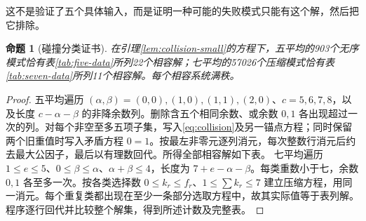 \documentclass[11pt,a4paper,oneside,openany]{book}
\newtheorem{proposition}[theorem]{命题}
\theoremstyle{definition}
\numberwithin{equation}{chapter}
\begin{document}
这不是验证了五个具体输入，而是证明一种可能的失败模式只能有这个解，然后把它排除。
\begin{proposition}[碰撞分类证书]\label{prop:collision-certificate}
在引理\ref{lem:collision-small}的方程下，五平均的903个无序模式恰有表\ref{tab:five-data}所列22个相容解；七平均的57026个压缩模式恰有表\ref{tab:seven-data}所列11个相容解。每个相容系统满秩。
\end{proposition}
\begin{proof}
五平均遍历 $(\alpha,\beta)=(0,0),(1,0),(1,1),(2,0)$、$c=5,6,7,8$，以及长度 $c-\alpha-\beta$ 的非降余数列。删除含五个相同余数、或余数 $0,1$ 各出现超过一次的列。对每个非空至多五项子集，写入\eqref{eq:collision}及另一锚点方程；同时保留两个旧重值时写入矛盾方程 $0=1$。按最左非零元逐列消元，每次整数行消元后约去最大公因子，最后以有理数回代。所得全部相容解如下表。
七平均遍历 $1\le e\le5$、$0\le\beta\le\alpha$、$\alpha+\beta\le4$，长度为 $7+e-\alpha-\beta$。每类重数小于七，余数 $0,1$ 各至多一次。按各类选择数 $0\le k_r\le f_r$、$1\le\sum k_r\le7$ 建立压缩方程，用同一消元。每个重复类都出现在至少一条部分选取方程中，故其实际值等于表列解。程序逐行回代并比较整个解集，得到所述计数及完整表。
\end{proof}
\begingroup\small
\end{document}
